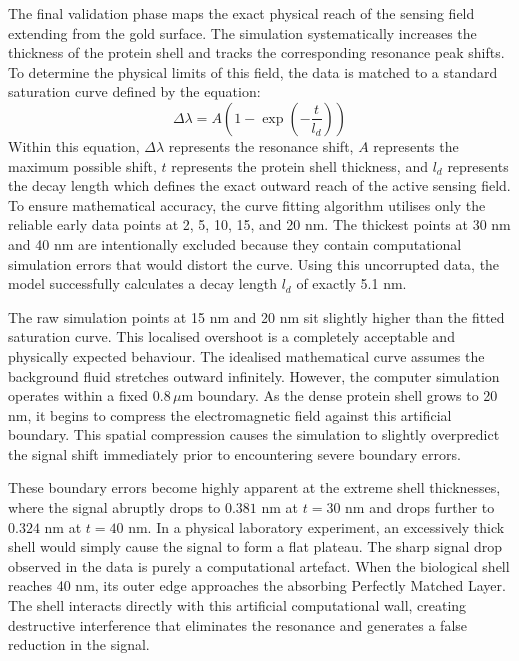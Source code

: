 \documentclass[class=report, crop=false]{standalone}
\begin{document}
The final validation phase maps the exact physical reach of the sensing field extending from the gold surface. The simulation systematically increases the thickness of the protein shell and tracks the corresponding resonance peak shifts. To determine the physical limits of this field, the data is matched to a standard saturation curve defined by the equation:
\begin{equation}
\Delta\lambda = A \left(1 - \exp\left(-\frac{t}{l_d}\right)\right)
\label{eq:decay_model}
\end{equation}
Within this equation, $\Delta\lambda$ represents the resonance shift, $A$ represents the maximum possible shift, $t$ represents the protein shell thickness, and $l_d$ represents the decay length which defines the exact outward reach of the active sensing field. To ensure mathematical accuracy, the curve fitting algorithm utilises only the reliable early data points at 2, 5, 10, 15, and 20 nm. The thickest points at 30 nm and 40 nm are intentionally excluded because they contain computational simulation errors that would distort the curve. Using this uncorrupted data, the model successfully calculates a decay length $l_d$ of exactly 5.1 nm.

\vspace{12pt}

The raw simulation points at 15 nm and 20 nm sit slightly higher than the fitted saturation curve. This localised overshoot is a completely acceptable and physically expected behaviour. The idealised mathematical curve assumes the background fluid stretches outward infinitely. However, the computer simulation operates within a fixed $0.8\,\mu$m boundary. As the dense protein shell grows to 20 nm, it begins to compress the electromagnetic field against this artificial boundary. This spatial compression causes the simulation to slightly overpredict the signal shift immediately prior to encountering severe boundary errors.

\vspace{12pt}

These boundary errors become highly apparent at the extreme shell thicknesses, where the signal abruptly drops to $0.381$ nm at $t = 30$ nm and drops further to $0.324$ nm at $t = 40$ nm. In a physical laboratory experiment, an excessively thick shell would simply cause the signal to form a flat plateau. The sharp signal drop observed in the data is purely a computational artefact. When the biological shell reaches 40 nm, its outer edge approaches the absorbing Perfectly Matched Layer. The shell interacts directly with this artificial computational wall, creating destructive interference that eliminates the resonance and generates a false reduction in the signal.
\end{document}

